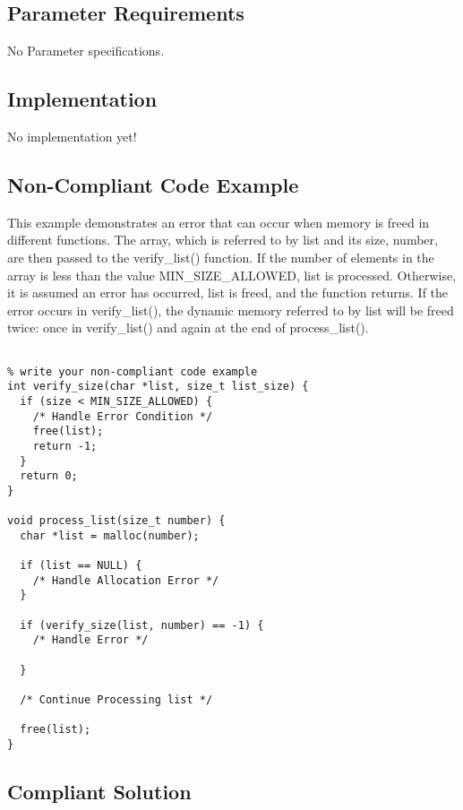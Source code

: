 \subsection{Parameter Requirements}

   No Parameter specifications.

\subsection{Implementation}

   No implementation yet!

\subsection{Non-Compliant Code Example}

This example demonstrates an error that can occur when memory is freed in
different functions. The array, which is referred to by list and its size,
number, are then passed to the verify\_list() function. If the number of
elements in the array is less than the value MIN\_SIZE\_ALLOWED, list is
processed. Otherwise, it is assumed an error has occurred, list is freed, and
the function returns. If the error occurs in verify\_list(), the dynamic memory
referred to by list will be freed twice: once in verify\_list() and again at the
end of process\_list().

\begin{verbatim}

% write your non-compliant code example
int verify_size(char *list, size_t list_size) {
  if (size < MIN_SIZE_ALLOWED) {
    /* Handle Error Condition */
    free(list);
    return -1;
  }
  return 0;
}

void process_list(size_t number) {
  char *list = malloc(number);

  if (list == NULL) {
    /* Handle Allocation Error */
  }

  if (verify_size(list, number) == -1) {
    /* Handle Error */

  }

  /* Continue Processing list */

  free(list);
}

\end{verbatim}

\subsection{Compliant Solution}

